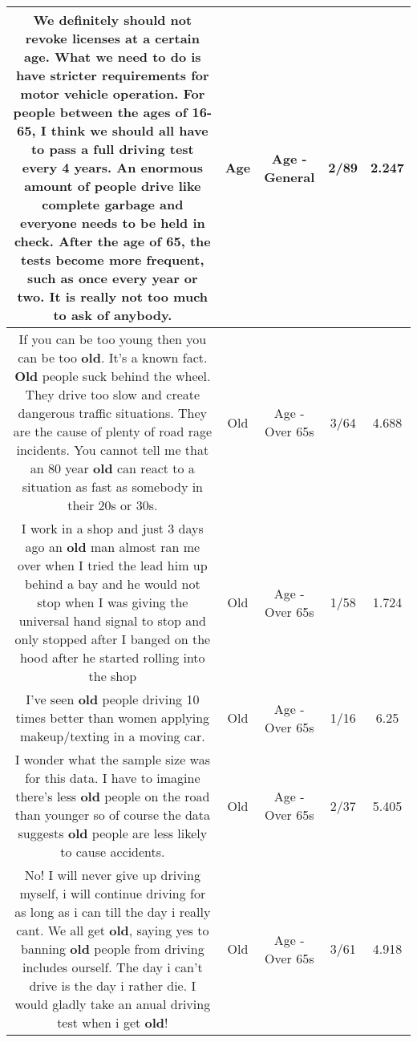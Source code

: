 \documentclass[11pt]{article}
\newlength\mylength
\begin{document}
\begin{center}
\begin{longtable}{|C{.65\mylength}|C{.30\mylength}|C{.12\mylength}|C{.12\mylength}|C{.12\mylength}|}
  \small We definitely should not revoke licenses at a certain \textbf{age}. What we need to do is have stricter requirements for motor vehicle operation. For people between the ages of 16-65, I think we should all have to pass a full driving test every 4 years. An enormous amount of people drive like complete garbage and everyone needs to be held in check. After the \textbf{age} of 65, the tests become more frequent, such as once every year or two. It is really not too much to ask of anybody.\normalsize   & Age & Age - General & 2/89 & 2.247 \\  \hline
  \small If you can be too young then you can be too \textbf{old}. It's a known fact. \textbf{Old} people suck behind the wheel. They drive too slow and create dangerous traffic situations. They are the cause of plenty of road rage incidents. You cannot tell me that an 80 year \textbf{old} can react to a situation as fast as somebody in their 20s or 30s.\normalsize   & Old & Age - Over 65s & 3/64 & 4.688 \\  \hline
  \small I work in a shop and just 3 days ago an \textbf{old} man almost ran me over when I tried the lead him up behind a bay and he would not stop when I was giving the universal hand signal to stop and only stopped after I banged on the hood after he started rolling into the shop\normalsize   & Old & Age - Over 65s & 1/58 & 1.724 \\  \hline
  \small I've seen \textbf{old} people driving 10 times better than women applying makeup/texting in a moving car.\normalsize   & Old & Age - Over 65s & 1/16 & 6.25 \\  \hline
  \small I wonder what the sample size was for this data. I have to imagine there's less \textbf{old} people on the road than younger so of course the data suggests \textbf{old} people are less likely to cause accidents.\normalsize   & Old & Age - Over 65s & 2/37 & 5.405 \\  \hline
  \small No! I will never give up driving myself, i will continue driving for as long as i can till the day i really cant. We all get \textbf{old}, saying yes to banning \textbf{old} people from driving includes ourself. The day i can't drive is the day i rather die. I would gladly take an anual driving test when i get \textbf{old}!\normalsize   & Old & Age - Over 65s & 3/61 & 4.918 \\  \hline

\end{longtable}
\end{center}
\end{document}
